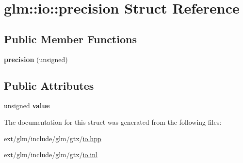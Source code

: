 \hypertarget{structglm_1_1io_1_1precision}{\section{glm\-:\-:io\-:\-:precision Struct Reference}
\label{structglm_1_1io_1_1precision}
}
\subsection*{Public Member Functions}
\begin{DoxyCompactItemize}
\item 
\hypertarget{structglm_1_1io_1_1precision_aa359e1766fd74b88e049d5449d521447}{{\bfseries precision} (unsigned)}\label{structglm_1_1io_1_1precision_aa359e1766fd74b88e049d5449d521447}

\end{DoxyCompactItemize}
\subsection*{Public Attributes}
\begin{DoxyCompactItemize}
\item 
\hypertarget{structglm_1_1io_1_1precision_a43da772dff9a209768c63f1220d52074}{unsigned {\bfseries value}}\label{structglm_1_1io_1_1precision_a43da772dff9a209768c63f1220d52074}

\end{DoxyCompactItemize}


The documentation for this struct was generated from the following files\-:\begin{DoxyCompactItemize}
\item 
ext/glm/include/glm/gtx/\hyperlink{io_8hpp}{io.\-hpp}\item 
ext/glm/include/glm/gtx/\hyperlink{io_8inl}{io.\-inl}\end{DoxyCompactItemize}
